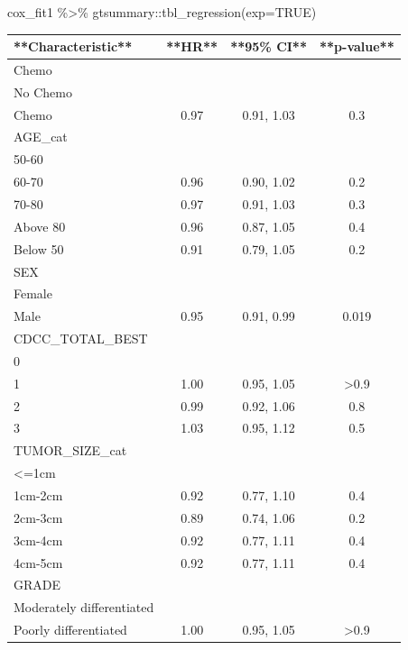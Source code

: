 \documentclass[
  11pt,
]{article}
\newenvironment{Shaded}{\begin{snugshade}}{\end{snugshade}}
\newcommand{\AttributeTok}[1]{\textcolor[rgb]{0.77,0.63,0.00}{#1}}
\newcommand{\ConstantTok}[1]{\textcolor[rgb]{0.00,0.00,0.00}{#1}}
\newcommand{\FunctionTok}[1]{\textcolor[rgb]{0.00,0.00,0.00}{#1}}
\newcommand{\NormalTok}[1]{#1}
\newcommand{\SpecialCharTok}[1]{\textcolor[rgb]{0.00,0.00,0.00}{#1}}
\begin{document}
\newpage

\begin{Shaded}
\begin{Highlighting}[]
\NormalTok{cox\_fit1 }\SpecialCharTok{\%\textgreater{}\%}
\NormalTok{  gtsummary}\SpecialCharTok{::}\FunctionTok{tbl\_regression}\NormalTok{(}\AttributeTok{exp=}\ConstantTok{TRUE}\NormalTok{)}
\end{Highlighting}
\end{Shaded}

\begin{tabular}{l|c|c|c}
\hline
**Characteristic** & **HR** & **95\% CI** & **p-value**\\
\hline
Chemo &  &  & \\
\hline
No Chemo &  &  & \\
\hline
Chemo & 0.97 & 0.91, 1.03 & 0.3\\
\hline
AGE\_cat &  &  & \\
\hline
50-60 &  &  & \\
\hline
60-70 & 0.96 & 0.90, 1.02 & 0.2\\
\hline
70-80 & 0.97 & 0.91, 1.03 & 0.3\\
\hline
Above 80 & 0.96 & 0.87, 1.05 & 0.4\\
\hline
Below 50 & 0.91 & 0.79, 1.05 & 0.2\\
\hline
SEX &  &  & \\
\hline
Female &  &  & \\
\hline
Male & 0.95 & 0.91, 0.99 & 0.019\\
\hline
CDCC\_TOTAL\_BEST &  &  & \\
\hline
0 &  &  & \\
\hline
1 & 1.00 & 0.95, 1.05 & >0.9\\
\hline
2 & 0.99 & 0.92, 1.06 & 0.8\\
\hline
3 & 1.03 & 0.95, 1.12 & 0.5\\
\hline
TUMOR\_SIZE\_cat &  &  & \\
\hline
<=1cm &  &  & \\
\hline
1cm-2cm & 0.92 & 0.77, 1.10 & 0.4\\
\hline
2cm-3cm & 0.89 & 0.74, 1.06 & 0.2\\
\hline
3cm-4cm & 0.92 & 0.77, 1.11 & 0.4\\
\hline
4cm-5cm & 0.92 & 0.77, 1.11 & 0.4\\
\hline
GRADE &  &  & \\
\hline
Moderately differentiated &  &  & \\
\hline
Poorly differentiated & 1.00 & 0.95, 1.05 & >0.9\\

\end{tabular}
\end{document}
